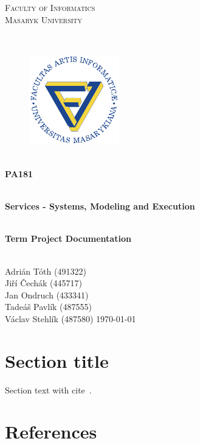 \documentclass[11pt,a4paper]{article}
\begin{document}
\begin{titlepage}

    \begin{center}
        \vfill {%
            \Huge{%
                \textsc{%
                    Faculty of Informatics\\[3mm]%
                    Masaryk University%
                }%
            }%
        }%

        \hfill\\[15mm]

        \begin{figure}[!h]
            \centering
            \includegraphics[scale=3]{muni-fi-logo.pdf}
        \end{figure}

        \hfill\\[10mm]

        \Huge{
            \textbf{
                PA181
            }
        }

        \hfill\\[-10mm]

        \huge{
            \textbf{
                Services - Systems, Modeling and Execution
            }
        }

        \hfill\\[10mm]

        \LARGE{
            \textbf{
                Term Project Documentation
            }
        }
        \vfill

    \end{center}

        \Large{
            \hfill\\
            Adrián Tóth (491322)\\
            Jiří Čechák (445717)\\
            Jan Ondruch (433341)\\
            Tadeáš Pavlík (487555)\\
            Václav Stehlík (487580) \hfill \today
        }

\end{titlepage}

\setlength{\parskip}{0pt}
    \hypersetup{hidelinks}\tableofcontents
\setlength{\parskip}{0pt}

\newpage

\section{Section title}

Section text with cite~\cite{BOOK}.

\newpage

\section{References}

\begin{flushleft}
    
\end{flushleft}
\end{document}
